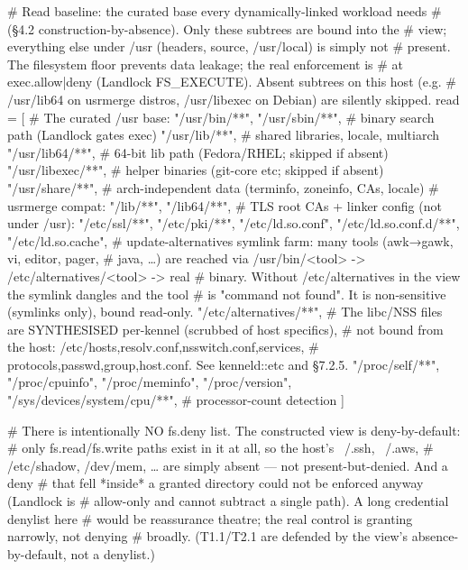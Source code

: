 \begin{kennelcode}
[fs]
# Read baseline: the curated base every dynamically-linked workload needs
# (§4.2 construction-by-absence). Only these subtrees are bound into the
# view; everything else under /usr (headers, source, /usr/local) is simply not
# present. The filesystem floor prevents data leakage; the real enforcement is
# at exec.allow|deny (Landlock FS_EXECUTE). Absent subtrees on this host (e.g.
# /usr/lib64 on usrmerge distros, /usr/libexec on Debian) are silently skipped.
read = [
    # The curated /usr base:
    "/usr/bin/**", "/usr/sbin/**",        # binary search path (Landlock gates exec)
    "/usr/lib/**",                        # shared libraries, locale, multiarch
    "/usr/lib64/**",                      # 64-bit lib path (Fedora/RHEL; skipped if absent)
    "/usr/libexec/**",                    # helper binaries (git-core etc; skipped if absent)
    "/usr/share/**",                      # arch-independent data (terminfo, zoneinfo, CAs, locale)
    # usrmerge compat:
    "/lib/**", "/lib64/**",
    # TLS root CAs + linker config (not under /usr):
    "/etc/ssl/**", "/etc/pki/**",
    "/etc/ld.so.conf", "/etc/ld.so.conf.d/**", "/etc/ld.so.cache",
    # update-alternatives symlink farm: many tools (awk→gawk, vi, editor, pager,
    # java, …) are reached via /usr/bin/<tool> -> /etc/alternatives/<tool> -> real
    # binary. Without /etc/alternatives in the view the symlink dangles and the tool
    # is "command not found". It is non-sensitive (symlinks only), bound read-only.
    "/etc/alternatives/**",
    # The libc/NSS files are SYNTHESISED per-kennel (scrubbed of host specifics),
    # not bound from the host: /etc/{hosts,resolv.conf,nsswitch.conf,services,
    # protocols,passwd,group,host.conf}. See kenneld::etc and §7.2.5.
    "/proc/self/**", "/proc/cpuinfo", "/proc/meminfo", "/proc/version",
    "/sys/devices/system/cpu/**",        # processor-count detection
]
\end{kennelcode}


\begin{kennelcode}
# There is intentionally NO fs.deny list. The constructed view is deny-by-default:
# only fs.read/fs.write paths exist in it at all, so the host's ~/.ssh, ~/.aws,
# /etc/shadow, /dev/mem, … are simply absent — not present-but-denied. And a deny
# that fell *inside* a granted directory could not be enforced anyway (Landlock is
# allow-only and cannot subtract a single path). A long credential denylist here
# would be reassurance theatre; the real control is granting narrowly, not denying
# broadly. (T1.1/T2.1 are defended by the view's absence-by-default, not a denylist.)
\end{kennelcode}

